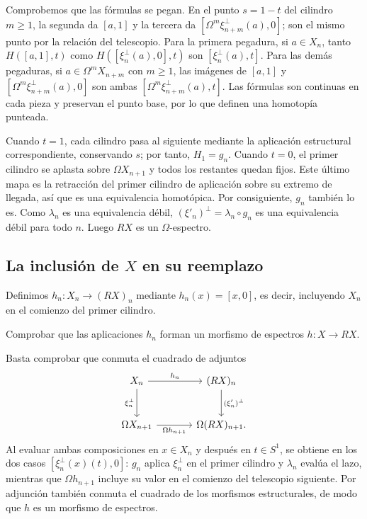 \begin{center}

\end{center}

Comprobemos que las fórmulas se pegan. En el punto $s=1-t$ del cilindro $m\ge1$, la segunda da $[a,1]$ y la tercera da $[\Omega^m\xi_{n+m}^{\perp}(a),0]$; son el mismo punto por la relación del telescopio. Para la primera pegadura, si $a\in X_n$, tanto $H([a,1],t)$ como $H([\xi_n^{\perp}(a),0],t)$ son $[\xi_n^{\perp}(a),t]$. Para las demás pegaduras, si $a\in\Omega^mX_{n+m}$ con $m\ge1$, las imágenes de $[a,1]$ y $[\Omega^m\xi_{n+m}^{\perp}(a),0]$ son ambas $[\Omega^m\xi_{n+m}^{\perp}(a),t]$. Las fórmulas son continuas en cada pieza y preservan el punto base, por lo que definen una homotopía punteada.

Cuando $t=1$, cada cilindro pasa al siguiente mediante la aplicación estructural correspondiente, conservando $s$; por tanto, $H_1=g_n$. Cuando $t=0$, el primer cilindro se aplasta sobre $\Omega X_{n+1}$ y todos los restantes quedan fijos. Este último mapa es la retracción del primer cilindro de aplicación sobre su extremo de llegada, así que es una equivalencia homotópica. Por consiguiente, $g_n$ también lo es. Como $\lambda_n$ es una equivalencia débil, $(\xi'_n)^{\perp}=\lambda_n\circ g_n$ es una equivalencia débil para todo $n$. Luego $RX$ es un $\Omega$-espectro.

\subsection{La inclusión de \texorpdfstring{$X$}{X} en su reemplazo}

Definimos $h_n\colon X_n\to(RX)_n$ mediante $h_n(x)=[x,0]$, es decir, incluyendo $X_n$ en el comienzo del primer cilindro.

\begin{ejer}\label{ejer:c10-inclusion-reemplazo}
Comprobar que las aplicaciones $h_n$ forman un morfismo de espectros $h\colon X\to RX$.
\end{ejer}
\begin{sol}
Basta comprobar que conmuta el cuadrado de adjuntos
\[
\begin{tikzcd}[column sep=large,row sep=large]
X_n \arrow[r,"h_n"] \arrow[d,"\xi_n^{\perp}"']
& (RX)_n \arrow[d,"(\xi'_n)^{\perp}"]\\
\Omega X_{n+1} \arrow[r,"\Omega h_{n+1}"'] & \Omega(RX)_{n+1}.
\end{tikzcd}
\]
Al evaluar ambas composiciones en $x\in X_n$ y después en $t\in S^1$, se obtiene en los dos casos $[\xi_n^{\perp}(x)(t),0]$: $g_n$ aplica $\xi_n^\perp$ en el primer cilindro y $\lambda_n$ evalúa el lazo, mientras que $\Omega h_{n+1}$ incluye su valor en el comienzo del telescopio siguiente. Por adjunción también conmuta el cuadrado de los morfismos estructurales, de modo que $h$ es un morfismo de espectros.
\end{sol}

